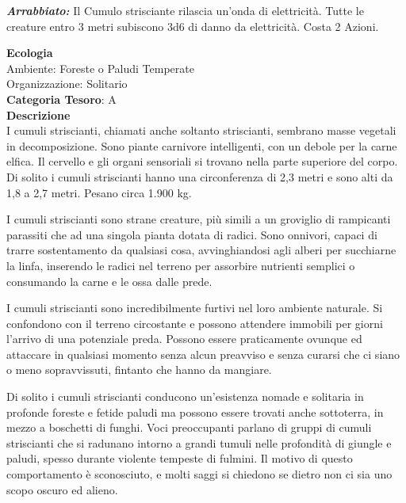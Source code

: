 \begin{multicols}{2}
{\emph{\textbf{Arrabbiato:}} Il Cumulo strisciante rilascia un'onda di elettricità. Tutte le creature entro 3 metri subiscono 3d6 di danno da elettricità. Costa 2 Azioni.

\textbf{Ecologia}\\
Ambiente: Foreste o Paludi Temperate\\
Organizzazione: Solitario\\
\textbf{Categoria Tesoro}: A\\
\textbf{Descrizione}\\
I cumuli striscianti, chiamati anche soltanto striscianti, sembrano masse vegetali in decomposizione. Sono piante carnivore intelligenti, con un debole per la carne elfica. Il cervello e gli organi sensoriali si trovano nella parte superiore del corpo. Di solito i cumuli striscianti hanno una circonferenza di 2,3 metri e sono alti da 1,8 a 2,7 metri. Pesano circa 1.900 kg.

I cumuli striscianti sono strane creature, più simili a un groviglio di rampicanti parassiti che ad una singola pianta dotata di radici. Sono onnivori, capaci di trarre sostentamento da qualsiasi cosa, avvinghiandosi agli alberi per succhiarne la linfa, inserendo le radici nel terreno per assorbire nutrienti semplici o consumando la carne e le ossa dalle prede.

I cumuli striscianti sono incredibilmente furtivi nel loro ambiente naturale. Si confondono con il terreno circostante e possono attendere immobili per giorni l'arrivo di una potenziale preda. Possono essere praticamente ovunque ed attaccare in qualsiasi momento senza alcun preavviso e senza curarsi che ci siano o meno sopravvissuti, fintanto che hanno da mangiare.

Di solito i cumuli striscianti conducono un'esistenza nomade e solitaria in profonde foreste e fetide paludi ma possono essere trovati anche sottoterra, in mezzo a boschetti di funghi. Voci preoccupanti parlano di gruppi di cumuli striscianti che si radunano intorno a grandi tumuli nelle profondità di giungle e paludi, spesso durante violente tempeste di fulmini. Il motivo di questo comportamento è sconosciuto, e molti saggi si chiedono se dietro non ci sia uno scopo oscuro ed alieno.


}
\end{multicols}
